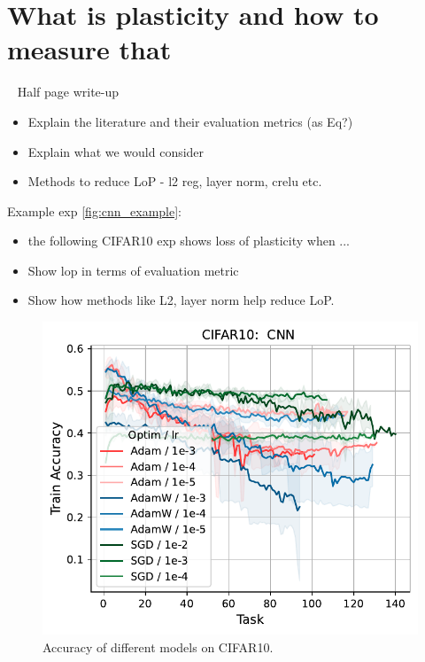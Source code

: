 \section{What is plasticity and how to measure that}

~ Half page write-up
\begin{itemize}
    \item Explain the literature and their evaluation metrics (as Eq?)
    \item Explain what we would consider
    \item Methods to reduce LoP - l2 reg, layer norm, crelu etc.
\end{itemize}


Example exp \autoref{fig:cnn_example}:
\begin{itemize}
    \item the following CIFAR10 exp shows loss of plasticity when ...
    \item Show lop in terms of evaluation metric
    \item Show how methods like L2, layer norm help reduce LoP.
\end{itemize}
\begin{figure}[t]
    \centering
    \includegraphics[width=\linewidth]{figs/Accuracy/image/cnn/cifar10_50.pdf}
    \caption{Accuracy of different models on CIFAR10.}
    \label{fig:cnn_example}
\end{figure}
